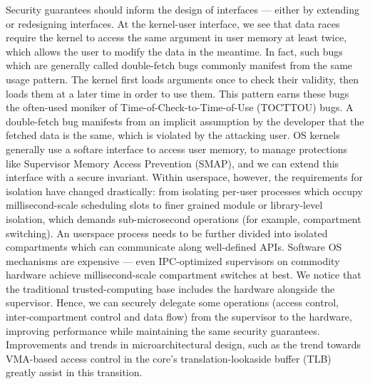 Security guarantees should inform the design of interfaces --- either by 
extending or redesigning interfaces.
% 
At the kernel-user interface, we see that data races require the kernel
to access the same argument in user memory at least twice, which
allows the user to modify the data in the meantime.
In fact, such bugs which are generally called double-fetch bugs commonly 
manifest from the same usage pattern.
The kernel first loads arguments once to check their validity, then
loads them at a later time in order to use them.
This pattern earns these bugs the often-used moniker of 
Time-of-Check-to-Time-of-Use (TOCTTOU) bugs.
A double-fetch bug manifests from an implicit assumption by the developer
that the fetched data is the same, which is violated by the attacking
user.
OS kernels generally use a softare interface to access user memory, to manage
protections like Supervisor Memory Access Prevention (SMAP), and we can
extend this interface with a secure invariant.
% 
Within userspace, however, the requirements for isolation have changed 
drastically: from isolating per-user processes which occupy millisecond-scale
scheduling slots to finer grained module or library-level isolation, which
demands sub-microsecond operations (for example, compartment switching).
An userspace process needs to be further divided into isolated compartments
which can communicate along well-defined APIs.
Software OS mechanisms are expensive --- even IPC-optimized supervisors
on commodity hardware achieve millisecond-scale compartment switches at
best.
We notice that the traditional trusted-computing base includes the hardware
alongside the supervisor.
Hence, we can securely delegate some operations (access control, inter-compartment
control and data flow) from the supervisor to the hardware, improving 
performance while maintaining the same security guarantees.
Improvements and trends in microarchitectural design, such as the trend towards
VMA-based access control in the core's translation-lookaside buffer 
(TLB)~\cite{0003BOBFP21midgard} greatly assist in this transition.


